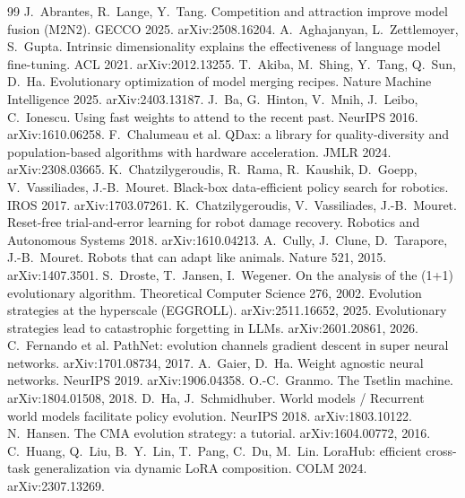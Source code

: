 \documentclass[11pt,a4paper]{article}
\theoremstyle{definition}
\theoremstyle{plain}
\theoremstyle{remark}
\begin{document}
\begin{thebibliography}{99}\small
{} J.~Abrantes, R.~Lange, Y.~Tang. Competition and attraction improve model fusion (M2N2). GECCO 2025. arXiv:2508.16204.
 A.~Aghajanyan, L.~Zettlemoyer, S.~Gupta. Intrinsic dimensionality explains the effectiveness of language model fine-tuning. ACL 2021. arXiv:2012.13255.
 T.~Akiba, M.~Shing, Y.~Tang, Q.~Sun, D.~Ha. Evolutionary optimization of model merging recipes. Nature Machine Intelligence 2025. arXiv:2403.13187.
 J.~Ba, G.~Hinton, V.~Mnih, J.~Leibo, C.~Ionescu. Using fast weights to attend to the recent past. NeurIPS 2016. arXiv:1610.06258.
 F.~Chalumeau et al. QDax: a library for quality-diversity and population-based algorithms with hardware acceleration. JMLR 2024. arXiv:2308.03665.
 K.~Chatzilygeroudis, R.~Rama, R.~Kaushik, D.~Goepp, V.~Vassiliades, J.-B.~Mouret. Black-box data-efficient policy search for robotics. IROS 2017. arXiv:1703.07261.
 K.~Chatzilygeroudis, V.~Vassiliades, J.-B.~Mouret. Reset-free trial-and-error learning for robot damage recovery. Robotics and Autonomous Systems 2018. arXiv:1610.04213.
 A.~Cully, J.~Clune, D.~Tarapore, J.-B.~Mouret. Robots that can adapt like animals. Nature 521, 2015. arXiv:1407.3501.
 S.~Droste, T.~Jansen, I.~Wegener. On the analysis of the (1+1) evolutionary algorithm. Theoretical Computer Science 276, 2002.
 Evolution strategies at the hyperscale (EGGROLL). arXiv:2511.16652, 2025.
 Evolutionary strategies lead to catastrophic forgetting in LLMs. arXiv:2601.20861, 2026.
 C.~Fernando et al. PathNet: evolution channels gradient descent in super neural networks. arXiv:1701.08734, 2017.
 A.~Gaier, D.~Ha. Weight agnostic neural networks. NeurIPS 2019. arXiv:1906.04358.
 O.-C.~Granmo. The Tsetlin machine. arXiv:1804.01508, 2018.
 D.~Ha, J.~Schmidhuber. World models / Recurrent world models facilitate policy evolution. NeurIPS 2018. arXiv:1803.10122.
 N.~Hansen. The CMA evolution strategy: a tutorial. arXiv:1604.00772, 2016.
 C.~Huang, Q.~Liu, B.~Y.~Lin, T.~Pang, C.~Du, M.~Lin. LoraHub: efficient cross-task generalization via dynamic LoRA composition. COLM 2024. arXiv:2307.13269.

\end{thebibliography}
\end{document}
